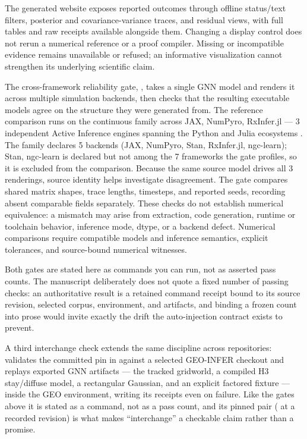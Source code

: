 \documentclass[
  english,
  9pt,
]{extarticle}
\begin{document}
The generated website exposes reported outcomes through offline
status/text filters, posterior and covariance-variance traces, and
residual views, with full tables and raw receipts available alongside
them. Changing a display control does not rerun a numerical reference or
a proof compiler. Missing or incompatible evidence remains unavailable
or refused; an informative visualization cannot strengthen its
underlying scientific claim.

The cross-framework reliability gate,
, takes a single
GNN model and renders it across multiple simulation backends, then
checks that the resulting executable models agree on the structure they
were generated from. The reference comparison runs on the continuous
family across JAX, NumPyro, RxInfer.jl --- 3 independent Active
Inference engines spanning the Python and Julia ecosystems
\citep{heins2022}. The family declares 5 backends (JAX, NumPyro, Stan,
RxInfer.jl, ngc-learn); Stan, ngc-learn is declared but not among the 7
frameworks the gate profiles, so it is excluded from the comparison.
Because the same source model drives all 3 renderings, source identity
helps investigate disagreement. The gate compares shared matrix shapes,
trace lengths, timesteps, and reported seeds, recording absent
comparable fields separately. These checks do not establish numerical
equivalence: a mismatch may arise from extraction, code generation,
runtime or toolchain behavior, inference mode, dtype, or a backend
defect. Numerical comparisons require compatible models and inference
semantics, explicit tolerances, and source-bound numerical witnesses.

Both gates are stated here as commands you can run, not as asserted pass
counts. The manuscript deliberately does not quote a fixed number of
passing checks: an authoritative result is a retained command receipt
bound to its source revision, selected corpus, environment, and
artifacts, and binding a frozen count into prose would invite exactly
the drift the auto-injection contract exists to prevent.

A third interchange check extends the same discipline across
repositories: 
validates the committed pin in  against a
selected GEO-INFER checkout and replays exported GNN artifacts --- the
tracked gridworld, a compiled H3 stay/diffuse model, a rectangular
Gaussian, and an explicit factored fixture --- inside the GEO
environment, writing its receipts even on failure. Like the gates above
it is stated as a command, not as a pass count, and its pinned pair
( at a recorded revision) is
what makes ``interchange'' a checkable claim rather than a promise.
\end{document}
